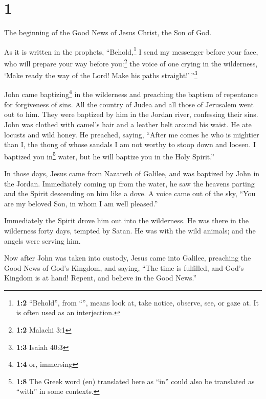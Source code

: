 \hypertarget{section}{%
\section{1}\label{section}}

 The beginning of the Good News of Jesus Christ, the Son
of God.

 As it is written in the prophets, ``Behold,\footnote{\textbf{1:2}
  ``Behold'', from ``'', means look at, take notice,
  observe, see, or gaze at. It is often used as an interjection.} I send
my messenger before your face, who will prepare your way before
you:\footnote{\textbf{1:2} Malachi 3:1}  the voice of one
crying in the wilderness, `Make ready the way of the Lord! Make his
paths straight!'\,''\footnote{\textbf{1:3} Isaiah 40:3}

 John came baptizing\footnote{\textbf{1:4} or, immersing}
in the wilderness and preaching the baptism of repentance for
forgiveness of sins.  All the country of Judea and all
those of Jerusalem went out to him. They were baptized by him in the
Jordan river, confessing their sins.  John was clothed
with camel's hair and a leather belt around his waist. He ate locusts
and wild honey.  He preached, saying, ``After me comes he
who is mightier than I, the thong of whose sandals I am not worthy to
stoop down and loosen.  I baptized you in\footnote{\textbf{1:8}
  The Greek word (en) translated here as ``in'' could also be translated
  as ``with'' in some contexts.} water, but he will baptize you in the
Holy Spirit.''

 In those days, Jesus came from Nazareth of Galilee, and
was baptized by John in the Jordan.  Immediately coming
up from the water, he saw the heavens parting and the Spirit descending
on him like a dove.  A voice came out of the sky, ``You
are my beloved Son, in whom I am well pleased.''

 Immediately the Spirit drove him out into the
wilderness.  He was there in the wilderness forty days,
tempted by Satan. He was with the wild animals; and the angels were
serving him.

 Now after John was taken into custody, Jesus came into
Galilee, preaching the Good News of God's Kingdom,  and
saying, ``The time is fulfilled, and God's Kingdom is at hand! Repent,
and believe in the Good News.''

